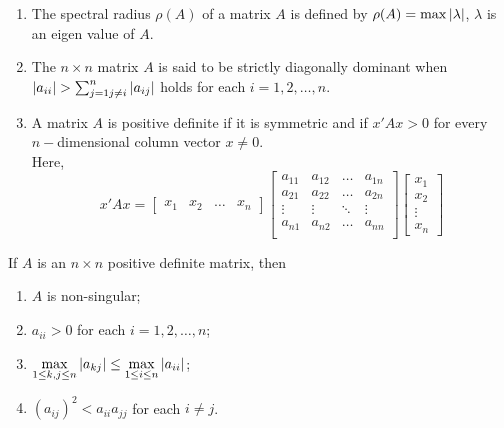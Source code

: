 \documentclass[../main-sheet.tex]{subfiles}
\begin{document}
\begin{note}\hfill
    \begin{enumerate}
        \item The spectral radius \(\rho(A)\) of a matrix \(A\) is defined by \(\rho(A)=\max \left\vert\lambda\right\vert\), \(\lambda\) is an eigen value of \(A\).
        \item The \(n\times n\) matrix \(A\) is said to be strictly diagonally dominant when \(\left\vert a_{ii}\right\vert>\sum_{j=1\\ j\neq i}^n \left\vert a_{ij}\right\vert\) holds for each \(i=1,2,\dots,n\).
        \item A matrix \(A\) is positive definite if it is symmetric and if \(x'Ax>0\) for every \(n-\)dimensional column vector \(x\neq 0\).\\
        Here, 
        \[
            x'Ax=\begin{bmatrix}
            x_1 & x_2 & \dots & x_n
            \end{bmatrix}\begin{bmatrix}
                a_{11} & a_{12} & \dots & a_{1n} \\
                a_{21} & a_{22} & \dots & a_{2n} \\
                \vdots & \vdots & \ddots & \vdots \\
                a_{n1} & a_{n2} & \dots & a_{nn} \\
            \end{bmatrix}\begin{bmatrix}
                x_1 \\
                 x_2 \\
                  \vdots \\
                   x_n
                \end{bmatrix}
        \]
    \end{enumerate}
\end{note}
\begin{thm}
    If \(A\) is an \(n\times n\) positive definite matrix, then
    \begin{enumerate}[label=(\roman*)]
        \item \(A\) is non-singular;
        \item \(a_{ii}>0\) for each \(i=1,2,\dots, n\);
        \item \(\displaystyle \max_{1\leq k,j\leq n} \left\vert a_{kj}\right\vert\leq \max_{1\leq i\leq n} \left\vert a_{ii}\right\vert\);
        \item \((a_{ij})^2< a_{ii}a_{jj}\) for each \(i\neq j\).
    \end{enumerate}
\end{thm}
\end{document}
